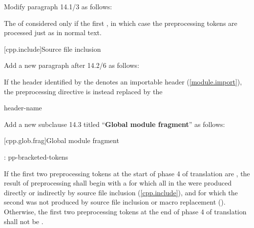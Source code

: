 Modify paragraph 14.1/3 as follows:

\begin{std.txt}
\pnum[3]
The 
of 
  considered
only if  the first 
,
in which case the preprocessing tokens are processed just as in normal text.
\end{std.txt}

\setcounter{section}{1}
[cpp.include]{Source file inclusion}%

\begin{after}
Add a new paragraph after 14.2/6 as follows:

\begin{std.txt}
\color{addclr}
\pnum[7]
If the header identified by the 
denotes an importable header (\ref{module.import}),
the preprocessing directive
is instead replaced by the 

\begin{bnf}
 header-name \terminal{;}
\end{bnf}
\end{std.txt}
\end{after}

\noindent
Add a new subclause 14.3 titled ``\textbf{Global module fragment}'' as follows:

\setcounter{section}{2}
[cpp.glob.frag]{Global module fragment}%

\begin{std.txt}
\color{addclr}
\begin{bnf}
:\br
   \terminal{;} pp-bracketed-tokens 
\end{bnf}

\pnum
If the first two preprocessing tokens at the start of phase 4 of translation
are  \tcode{;}, the result of preprocessing shall begin with
a  for which all
 in the 
were produced directly or indirectly by source file inclusion
(\ref{cpp.include}), and for which the second 
 was not produced by source file inclusion or
macro replacement ().
Otherwise, the first two preprocessing tokens at the end of phase 4 of
translation shall not be  \tcode{;}.
\end{std.txt}

